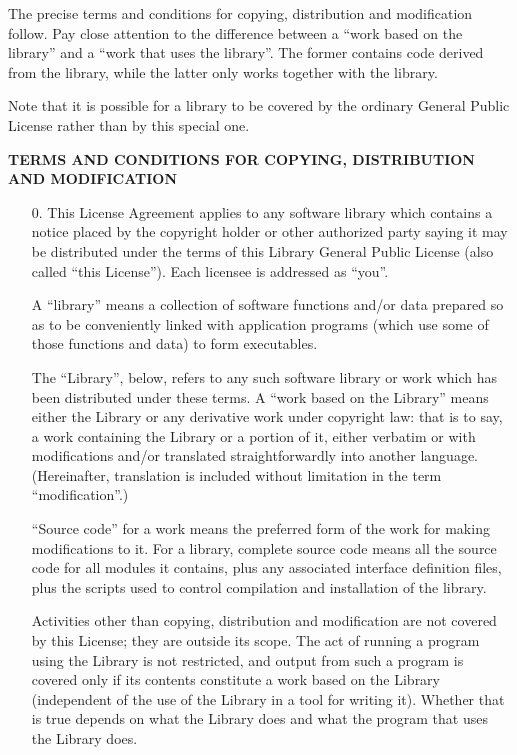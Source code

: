 \begin{multicols}{3}
The precise terms and conditions for copying, distribution and modification
follow. Pay close attention to the difference between a ``work based on the
library'' and a ``work that uses the library''. The former contains code
derived from the library, while the latter only works together with the
library.

Note that it is possible for a library to be covered by the ordinary
General Public License rather than by this special one.

\begin{center}
\bf TERMS AND CONDITIONS FOR COPYING, DISTRIBUTION AND MODIFICATION
\end{center}

\begin{itemize}
\item[0.] This License Agreement applies to any software library which
  contains a notice placed by the copyright holder or other authorized
  party saying it may be distributed under the terms of this Library
  General Public License (also called ``this License''). Each licensee
  is addressed as ``you''.

   A ``library'' means a collection of software functions and/or data
   prepared so as to be conveniently linked with application programs
   (which use some of those functions and data) to form executables.

   The ``Library'', below, refers to any such software library or work which
   has been distributed under these terms. A ``work based on the Library''
   means either the Library or any derivative work under copyright law:
   that is to say, a work containing the Library or a portion of it, either
   verbatim or with modifications and/or translated straightforwardly into
   another language. (Hereinafter, translation is included without
   limitation in the term ``modification''.)

   ``Source code'' for a work means the preferred form of the work for making
   modifications to it. For a library, complete source code means all the
   source code for all modules it contains, plus any associated interface
   definition files, plus the scripts used to control compilation and
   installation of the library.

   Activities other than copying, distribution and modification are not
   covered by this License; they are outside its scope. The act of running
   a program using the Library is not restricted, and output from such a
   program is covered only if its contents constitute a work based on the
   Library (independent of the use of the Library in a tool for writing
   it). Whether that is true depends on what the Library does and what the
   program that uses the Library does.
   

\end{itemize}
\end{multicols}
